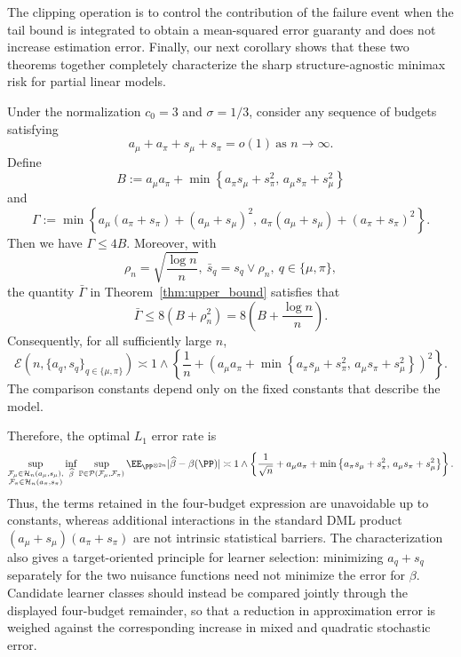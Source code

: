 \documentclass[11pt]{article}
\renewcommand{\hat}[1]{\widehat{#1}}
\begin{document}
The clipping operation is to control the contribution of
the failure event when the tail bound is integrated to obtain a
mean-squared error guaranty and does not increase estimation error. Finally, our next corollary shows that these two theorems together completely characterize the sharp structure-agnostic minimax risk for partial linear models.

\begin{corollary}
\label{cor:final_characterization}
Under the normalization \(c_0=3\) and \(\sigma=1/3\), consider any sequence
of budgets satisfying
\[
a_\mu+a_\pi+s_\mu+s_\pi=o(1)
\ \text{as }n\to\infty.
\]
Define
\[
B
:=
a_\mu a_\pi
+
\min\left\{
a_\pi s_\mu+s_\pi^2,\,
a_\mu s_\pi+s_\mu^2
\right\}
\]
and
\[
\Gamma
:=
\min\left\{
a_\mu(a_\pi+s_\pi)+(a_\mu+s_\mu)^2,\,
a_\pi(a_\mu+s_\mu)+(a_\pi+s_\pi)^2
\right\}.
\]
Then we have $\Gamma\leq4B$.
Moreover, with
\[
\rho_n=\sqrt{\frac{\log n}{n}},
\ 
\bar s_q=s_q\vee\rho_n,
\ q\in\{\mu,\pi\},
\]
the quantity \(\bar\Gamma\) in Theorem~\ref{thm:upper_bound} satisfies that
\[
\bar\Gamma
\leq
8\left(B+\rho_n^2\right)
=
8\left(B+\frac{\log n}{n}\right).
\]
Consequently, for all sufficiently large \(n\),
\[
\mathcal E\!\left(
n,\{a_q,s_q\}_{q\in\{\mu,\pi\}}
\right)
\asymp
1\wedge
\left\{
\frac1n+
\left(
a_\mu a_\pi
+
\min\left\{
a_\pi s_\mu+s_\pi^2,\,
a_\mu s_\pi+s_\mu^2
\right\}
\right)^2
\right\}.
\]
The comparison constants depend only on the fixed 
constants that describe the model.
\end{corollary}
Therefore, the optimal $L_1$ error rate is
\begin{align*}
\sup_{\substack{\mathcal F_\mu\in
\mathcal H_n(a_\mu,s_\mu),\\
\mathcal F_\pi\in
\mathcal H_n(a_\pi,s_\pi)
}}
\inf_{\widehat\beta}
\sup_{\mathbb P\in
\mathcal P(\mathcal F_\mu,\mathcal F_\pi)}\EE_{\PP^{\otimes 2n}}|\hat{\beta}-\beta(\PP)|\asymp1\wedge
\left\{
\frac1{\sqrt n}
+a_\mu a_\pi
+\min\left\{
a_\pi s_\mu+s_\pi^2,\,
a_\mu s_\pi+s_\mu^2
\right\}
\right\}.
\end{align*}
Thus, the terms retained in the four-budget expression are unavoidable up
to constants, whereas additional interactions in the standard DML product
\((a_\mu+s_\mu)(a_\pi+s_\pi)\) are not intrinsic statistical barriers.
The characterization also gives a target-oriented principle for learner
selection: minimizing \(a_q+s_q\) separately for the two nuisance functions
need not minimize the error for \(\beta\).  Candidate learner classes should
instead be compared jointly through the displayed four-budget remainder, so
that a reduction in approximation error is weighed against the corresponding
increase in mixed and quadratic stochastic error.
\end{document}
